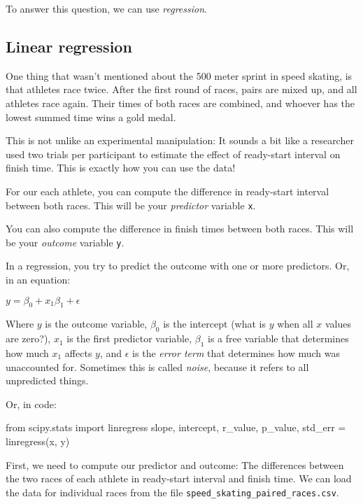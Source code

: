 \documentclass[11pt]{article}
\newenvironment{Shaded}{}{}
\newcommand{\NormalTok}[1]{{#1}}
\newcommand{\ImportTok}[1]{{#1}}
\newcommand{\OperatorTok}[1]{\textcolor[rgb]{0.40,0.40,0.40}{{#1}}}
\begin{document}
To answer this question, we can use \emph{regression}.

    \subsection{Linear regression}\label{linear-regression}

One thing that wasn't mentioned about the 500 meter sprint in speed
skating, is that athletes race twice. After the first round of races,
pairs are mixed up, and all athletes race again. Their times of both
races are combined, and whoever has the lowest summed time wins a gold
medal.

This is not unlike an experimental manipulation: It sounds a bit like a
researcher used two trials per participant to estimate the effect of
ready-start interval on finish time. This is exactly how you can use the
data!

For our each athlete, you can compute the difference in ready-start
interval between both races. This will be your \emph{predictor} variable
\texttt{x}.

You can also compute the difference in finish times between both races.
This will be your \emph{outcome} variable \texttt{y}.

In a regression, you try to predict the outcome with one or more
predictors. Or, in an equation:

\(y = \beta_{0} + x_{1} \beta_{1} + \epsilon\)

Where \(y\) is the outcome variable, \(\beta_{0}\) is the intercept
(what is \(y\) when all \(x\) values are zero?), \(x_{1}\) is the first
predictor variable, \(\beta_{1}\) is a free variable that determines how
much \(x_{1}\) affects \(y\), and \(\epsilon\) is the \emph{error term}
that determines how much was unaccounted for. Sometimes this is called
\emph{noise}, because it refers to all unpredicted things.

Or, in code:

\begin{Shaded}
\begin{Highlighting}[]
\ImportTok{from} \NormalTok{scipy.stats }\ImportTok{import} \NormalTok{linregress}
\NormalTok{slope, intercept, r_value, p_value, std_err }\OperatorTok{=} \NormalTok{linregress(x, y)}
\end{Highlighting}
\end{Shaded}

    First, we need to compute our predictor and outcome: The differences
between the two races of each athlete in ready-start interval and finish
time. We can load the data for individual races from the file
\texttt{speed\_skating\_paired\_races.csv}.
\end{document}
